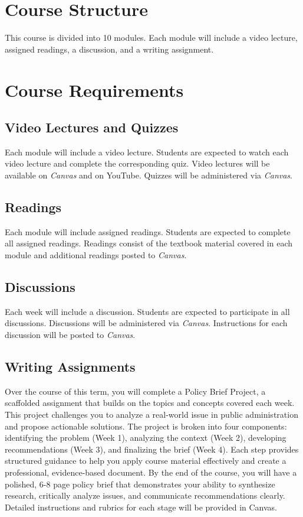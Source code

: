 \documentclass[11pt, letterpaper]{article}
\begin{document}
\section*{Course Structure}

This course is divided into 10 modules. Each module will include a video lecture, assigned readings, a discussion, and a writing assignment. 
\section*{Course Requirements}

\subsection*{Video Lectures and Quizzes}

Each module will include a video lecture. Students are expected to watch each video lecture and complete the corresponding quiz. Video lectures will be available on \emph{Canvas} and on YouTube. Quizzes will be administered via \emph{Canvas}.

\subsection*{Readings}

Each module will include assigned readings. Students are expected to complete all assigned readings. Readings consist of the textbook material covered in each module and additional readings posted to \emph{Canvas}.

\subsection*{Discussions}

Each week will include a discussion. Students are expected to participate in all discussions. Discussions will be administered via \emph{Canvas}. Instructions for each discussion will be posted to \emph{Canvas}.

\subsection*{Writing Assignments}
Over the course of this term, you will complete a Policy Brief Project, a scaffolded assignment that builds on the topics and concepts covered each week. This project challenges you to analyze a real-world issue in public administration and propose actionable solutions. The project is broken into four components: identifying the problem (Week 1), analyzing the context (Week 2), developing recommendations (Week 3), and finalizing the brief (Week 4). Each step provides structured guidance to help you apply course material effectively and create a professional, evidence-based document. By the end of the course, you will have a polished, 6-8 page policy brief that demonstrates your ability to synthesize research, critically analyze issues, and communicate recommendations clearly. Detailed instructions and rubrics for each stage will be provided in Canvas.
\end{document}
